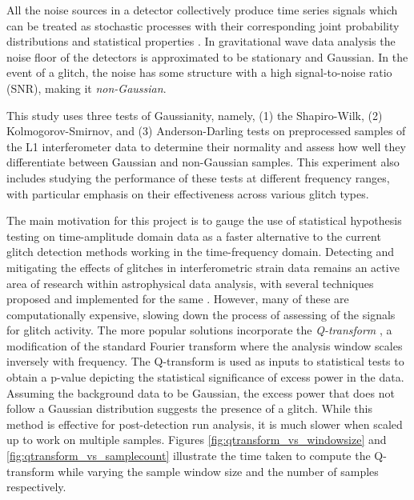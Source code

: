 \documentclass[12pt]{article}
\begin{document}

\medskip
\noindent All the noise sources in a detector collectively produce time series signals which can be treated as stochastic processes with their corresponding joint probability distributions and statistical properties \cite{collaboration_guide_2020}. In gravitational wave data analysis the noise floor of the detectors is approximated to be stationary and Gaussian. In the event of a glitch, the noise has some structure with a high signal-to-noise ratio (SNR), making it \textit{non-Gaussian}. 

\medskip
\noindent This study uses three tests of Gaussianity, namely, (1) the Shapiro-Wilk, (2) Kolmogorov-Smirnov, and (3) Anderson-Darling tests on preprocessed samples of the L1 interferometer data to determine their normality and assess how well they differentiate between Gaussian and non-Gaussian samples. This experiment also includes studying the performance of these tests at different frequency ranges, with particular emphasis on their effectiveness across various glitch types.

\medskip
\noindent The main motivation for this project is to gauge the use of statistical hypothesis testing on time-amplitude domain data as a faster alternative to the current glitch detection methods working in the time-frequency domain. Detecting and mitigating the effects of glitches in interferometric strain data remains an active area of research within astrophysical data analysis, with several techniques proposed and implemented for the same \cite{robinet_omicron_2020, MACLEOD2021100657, davis_subtracting_2022}. However, many of these are computationally expensive, slowing down the process of assessing of the signals for glitch activity. The more popular solutions incorporate the \textit{Q-transform} \cite{chatterji_multiresolution_2004, vazsonyi_identifying_2023}, a modification of the standard Fourier transform where the analysis window scales inversely with frequency. The Q-transform is used as inputs to statistical tests to obtain a p-value depicting the statistical significance of excess power in the data. Assuming the background data to be Gaussian, the excess power that does not follow a Gaussian distribution suggests the presence of a glitch. While this method is effective for post-detection run analysis, it is much slower when scaled up to work on multiple samples. Figures \ref{fig:qtransform_vs_windowsize} and \ref{fig:qtransform_vs_samplecount} illustrate the time taken to compute the Q-transform while varying the sample window size and the number of samples respectively. 
\end{document}
